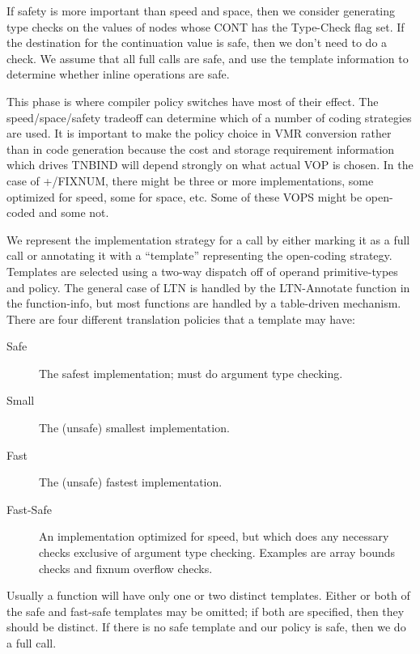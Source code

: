 If safety is more important than speed and space, then we consider generating
type checks on the values of nodes whose CONT has the Type-Check flag set.  If
the destination for the continuation value is safe, then we don't need to do
a check.  We assume that all full calls are safe, and use the template
information to determine whether inline operations are safe.

This phase is where compiler policy switches have most of their effect.  The
speed/space/safety tradeoff can determine which of a number of coding
strategies are used.  It is important to make the policy choice in VMR
conversion rather than in code generation because the cost and storage
requirement information which drives TNBIND will depend strongly on what actual
VOP is chosen.  In the case of +/FIXNUM, there might be three or more
implementations, some optimized for speed, some for space, etc.  Some of these
VOPS might be open-coded and some not.

We represent the implementation strategy for a call by either marking it as a
full call or annotating it with a ``template'' representing the open-coding
strategy.  Templates are selected using a two-way dispatch off of operand
primitive-types and policy.  The general case of LTN is handled by the
LTN-Annotate function in the function-info, but most functions are handled by a
table-driven mechanism.  There are four different translation policies that a
template may have:
\begin{description}
\item[Safe]
        The safest implementation; must do argument type checking.

\item[Small]
        The (unsafe) smallest implementation.

\item[Fast]
        The (unsafe) fastest implementation.

\item[Fast-Safe]
        An implementation optimized for speed, but which does any necessary
        checks exclusive of argument type checking.  Examples are array bounds
        checks and fixnum overflow checks.
\end{description}

Usually a function will have only one or two distinct templates.  Either or
both of the safe and fast-safe templates may be omitted; if both are specified,
then they should be distinct.  If there is no safe template and our policy is
safe, then we do a full call.

